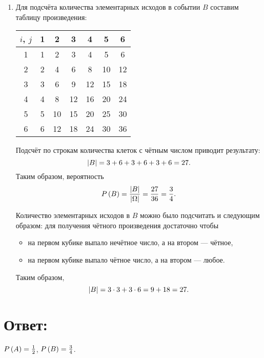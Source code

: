 \begin{enumerate}
    \item
    Для подсчёта количества элементарных исходов в событии $B$ составим таблицу произведения:
    \begin{center}
        \begin{tabular}{c|c|c|c|c|c|c|}
            $i$, $j$ & 1 & 2  & 3  & 4  & 5  & 6  \\
            \hline
            1        & 1 & 2  & 3  & 4  & 5  & 6  \\
            \hline
            2        & 2 & 4  & 6  & 8  & 10 & 12 \\
            \hline
            3        & 3 & 6  & 9  & 12 & 15 & 18 \\
            \hline
            4        & 4 & 8  & 12 & 16 & 20 & 24 \\
            \hline
            5        & 5 & 10 & 15 & 20 & 25 & 30 \\
            \hline
            6        & 6 & 12 & 18 & 24 & 30 & 36 \\
            \hline
        \end{tabular}
    \end{center}
    Подсчёт по строкам количества клеток с чётным числом приводит результату:
    \begin{equation}
        \left | B \right | = 3 + 6 + 3 + 6 + 3 + 6 = 27 .
    \end{equation}
    Таким образом, вероятность
    \begin{equation}
        P \left ( B \right ) = \frac{\left | B \right |}{\left | \Omega \right |} = \frac{27}{36} = \frac{3}{4} .
    \end{equation}

    Количество элементарных исходов в $B$ можно было подсчитать и следующим образом: для получения чётного произведения достаточно чтобы
    \begin{itemize}
        \item на первом кубике выпало нечётное число, а на втором --- чётное,
        \item на первом кубике выпало чётное число, а на втором --- любое.
    \end{itemize}
    Таким образом,
    \begin{equation}
        \left | B \right | = 3 \cdot 3 + 3 \cdot 6 = 9 + 18 = 27 .
    \end{equation}
\end{enumerate}

\section*{Ответ:}

$P \left ( A \right ) = \frac{1}{2}$, $P \left ( B \right ) = \frac{3}{4}$.